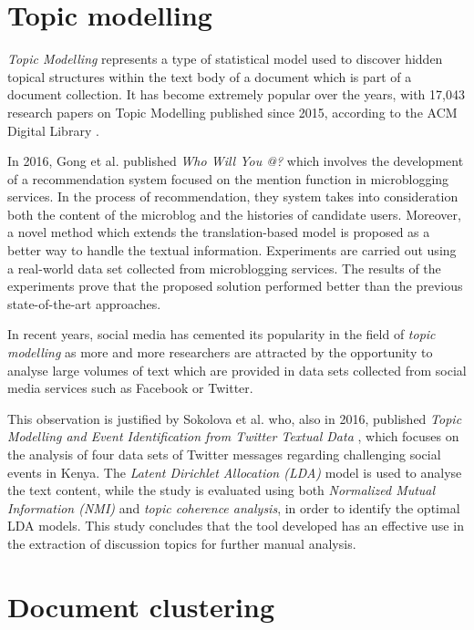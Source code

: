 \section{Topic modelling}

\textit{Topic Modelling} represents a type of statistical model used to discover hidden topical structures within the text body of a document which is part of a document collection. It has become extremely popular over the years, with 17,043 research papers on Topic Modelling published since 2015, according to the ACM Digital Library \cite{acm_digital_library}.

In 2016, Gong et al. published \textit{Who Will You @?} \cite{gong2015will} which involves the development of a recommendation system focused on the mention function in microblogging services. In the process of recommendation, they system takes into consideration both the content of the microblog and the histories of candidate users. Moreover, a novel method which extends the translation-based model is proposed as a better way to handle the textual information. Experiments are carried out using a real-world data set collected from microblogging services. The results of the experiments prove that the proposed solution performed better than the previous state-of-the-art approaches.

In recent years, social media has cemented its popularity in the field of \textit{topic modelling} as more and more researchers are attracted by the opportunity to analyse large volumes of text which are provided in data sets collected from social media services such as Facebook or Twitter.

This observation is justified by Sokolova et al. who, also in 2016, published \textit{Topic Modelling and Event Identification from Twitter Textual Data} \cite{sokolova2016topic}, which focuses on the analysis of four data sets of Twitter messages regarding challenging social events in Kenya. The \textit{Latent Dirichlet Allocation (LDA)} model is used to analyse the text content, while the study is evaluated using both \textit{Normalized Mutual Information (NMI)} and \textit{topic coherence analysis}, in order to identify the optimal LDA models. This study concludes that the tool developed has an effective use in the extraction of discussion topics for further manual analysis.

\section{Document clustering}

